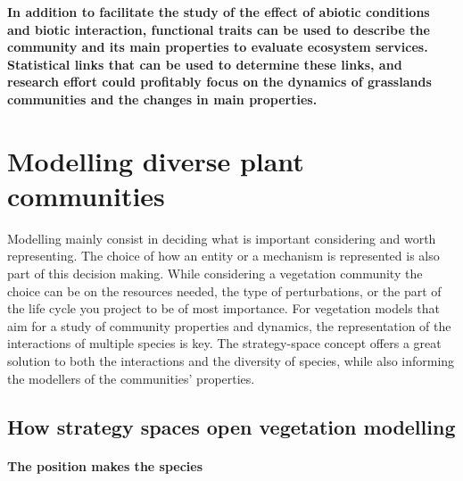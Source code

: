 \textbf{ In addition to facilitate the study of the effect of abiotic conditions and biotic interaction, functional traits can be used to describe the community and its main properties to evaluate ecosystem services. Statistical links that can be used to determine these links, and research effort could profitably focus on the dynamics of grasslands communities and the changes in main properties.}




\section{Modelling diverse plant communities}

Modelling mainly consist in deciding what is important considering and worth representing. The choice of how an entity or a mechanism is represented is also part of this decision making. While considering a vegetation community the choice can be on the resources needed, the type of perturbations, or the part of the life cycle you project to be of most importance. For vegetation models that aim for a study of community properties and dynamics, the representation of the interactions of multiple species is key. The strategy-space concept offers a great solution to both the interactions and the diversity of species, while also informing the modellers of the communities' properties.

\subsection{How strategy spaces open vegetation modelling}


\paragraph{The position makes the species}

